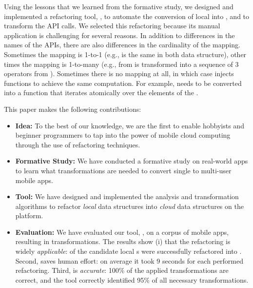 \documentclass[preprint]{sigplanconf}
\begin{document}
Using the lessons that we learned from the formative study, we designed and implemented a refactoring tool, \tool, to automate the conversion of local \NC{} into , and to transform the API calls. We selected this refactoring because its manual application is 
challenging for several reasons.
In addition to differences in the names of the APIs, there are also differences in the cardinality of the mapping.
Sometimes the mapping is 1-to-1 (e.g.,  is the same in both data structure), other times the mapping is 1-to-many (e.g.,  from  is transformed into a sequence of 3 operators from ). Sometimes there is no mapping at all, in which case \tool injects functions to achieve the same computation. For example,  needs to be converted into a function that iterates atomically over the elements of the . 

This paper makes the following contributions:
\begin{itemize}
\item{\textbf{Idea:}} To the best of our knowledge, we are the first to enable hobbyists and beginner programmers to tap into the power of mobile cloud
computing through the use of refactoring techniques.

\item{\textbf{Formative Study:}} We have conducted a formative study on \numFormative real-world apps to learn what transformations are needed to convert single to multi-user mobile apps. 

\item{\textbf{Tool:}} We have designed and implemented the analysis and transformation algorithms to refactor \emph{local} data structures into \emph{cloud} data structures on the \TD platform. 

\item{\textbf{Evaluation:}} We have evaluated our tool, \tool, on a corpus of \numScripts mobile apps, resulting in \numTransformations transformations. The results show (i) that the refactoring is widely \emph{applicable}: \percentRefactored of the candidate local s were successfully refactored into . Second, \tool saves human effort: on average it took 9 seconds for each performed refactoring. Third, \tool is  
\emph{accurate}: 100\% of the applied transformations are correct, and the tool correctly identified 95\% of all necessary transformations.  
\end{itemize}
\end{document}
